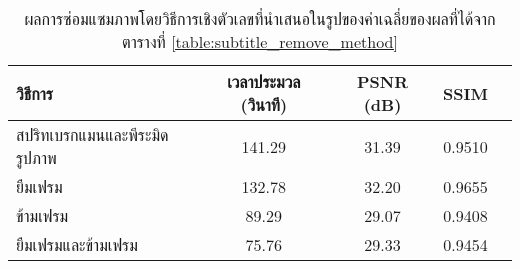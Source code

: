 \begin{table}[H]
    \centering
    \begin{tabular}[ht]{|l|c|c|c|c|}
        \hline
        วิธีการ  & เวลาประมวล  (วินาที) & PSNR (dB) & SSIM \\
        \hline
        สปริทเบรกแมนและพีระมิดรูปภาพ & 141.29 & 31.39  &  0.9510\\
        ยืมเฟรม & 132.78 & 32.20 & 0.9655\\
        ข้ามเฟรม & 89.29 & 29.07 & 0.9408 \\
        ยืมเฟรมและข้ามเฟรม & 75.76 & 29.33 & 0.9454 \\
        \hline
    \end{tabular}
    \caption{ผลการซ่อมแซมภาพโดยวิธีการเชิงตัวเลขที่นำเสนอในรูปของค่าเฉลี่ยของผลที่ได้จากตารางที่ \ref{table:subtitle_remove_method}}
\end{table}